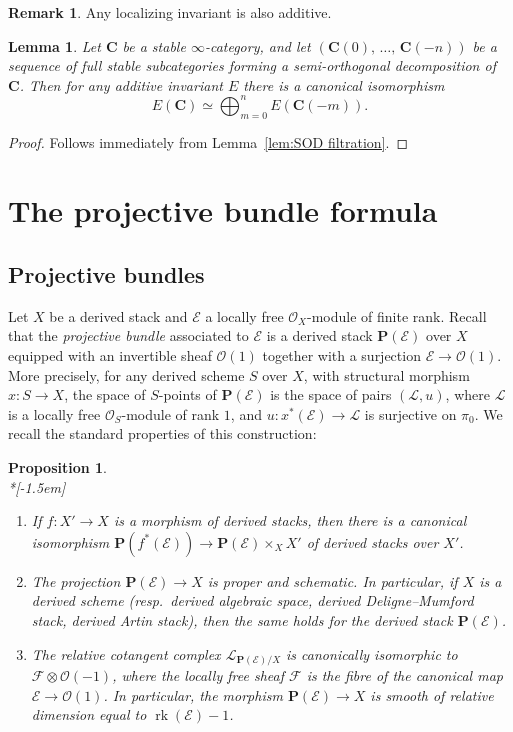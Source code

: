 \documentclass[11pt]{article}
\newtheorem{lemm}[theo]{Lemma}
\newtheorem{prop}[theo]{Proposition}
\theoremstyle{definition}
\newtheorem{rema}[theo]{Remark}
\numberwithin{equation}{section}
\numberwithin{figure}{section}
\numberwithin{table}{section}
\DeclareMathOperator*{\fibprod}{\times}
\newcommand{\sE}{\ensuremath{\mathcal{E}}\xspace}
\newcommand{\sF}{\ensuremath{\mathcal{F}}\xspace}
\newcommand{\sL}{\ensuremath{\mathcal{L}}\xspace}
\newcommand{\sO}{\ensuremath{\mathcal{O}}\xspace}
\newcommand{\bC}{\ensuremath{\mathbf{C}}\xspace}
\newcommand{\bP}{\ensuremath{\mathbf{P}}\xspace}
\renewcommand{\P}{\bP}
\DeclareMathOperator{\rk}{rk}
\newcommand*{\romanenumi}{\renewcommand*{\theenumi}{\roman{enumi}}}
\begin{document}
\begin{rema}
Any localizing invariant is also additive.
\end{rema}

\begin{lemm}\label{lem:additive}
Let $\bC$ be a stable $\infty$-category, and let $(\bC(0),\,\ldots,\,\bC(-n))$ be a sequence of full stable subcategories forming a semi-orthogonal decomposition of $\bC$. Then for any additive invariant $E$ there is a canonical isomorphism
\[
E(\bC) \simeq \bigoplus_{m=0}^n E(\bC(-m)).
\]
\end{lemm}

\begin{proof}
Follows immediately from Lemma~\ref{lem:SOD filtration}.
\end{proof}

\section{The projective bundle formula}\label{sec:proj}

\subsection{Projective bundles}\label{ssec:proj/proj}

Let $X$ be a derived stack and $\sE$ a locally free $\sO_X$-module of finite rank. Recall that the \emph{projective bundle} associated to $\sE$ is a derived stack $\P(\sE)$ over $X$ equipped with an invertible sheaf $\sO(1)$ together with a surjection $\sE \to \sO(1)$. More precisely, for any derived scheme $S$ over $X$, with structural morphism $x : S \to X$, the space of $S$-points of $\P(\sE)$ is the space of pairs $(\sL, u)$, where $\sL$ is a locally free $\sO_S$-module of rank $1$, and $u : x^*(\sE) \to \sL$ is surjective on $\pi_0$. We recall the standard properties of this construction:

\begin{prop} \ \\*[-1.5em]
\begin{enumerate}\romanenumi
\item If $f : X' \to X$ is a morphism of derived stacks, then there is a canonical isomorphism $\P(f^*(\sE)) \to \P(\sE) \fibprod_X X'$ of derived stacks over $X'$.
\item The projection $\P(\sE)\to X$ is proper and schematic. In particular, if $X$ is a derived scheme (resp.~derived algebraic space, derived Deligne--Mumford stack, derived Artin stack), then the same holds for the derived stack $\P(\sE)$.
\item The relative cotangent complex $\sL_{\P(\sE)/X}$ is canonically isomorphic to $\sF \otimes \sO(-1)$, where the locally free sheaf $\sF$ is the fibre of the canonical map $\sE \to \sO(1)$. In particular, the morphism $\P(\sE) \to X$ is smooth of relative dimension equal to $\rk(\sE) - 1$.
\end{enumerate}
\end{prop}
\end{document}
